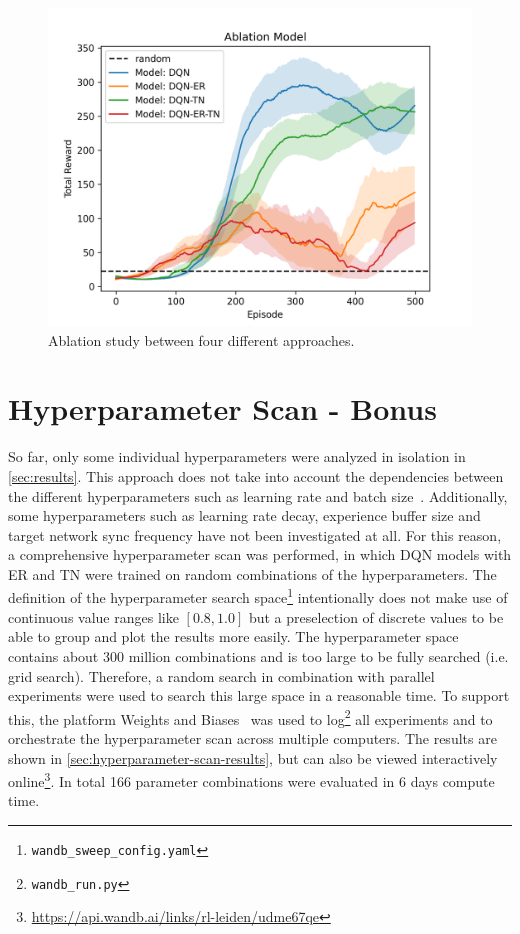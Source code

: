 \documentclass{article}
\begin{document}
\begin{figure}[ht!]
   \centering
   \includegraphics[width=0.9\columnwidth]{assets/Ablation/ablation_study.png}
   \caption{Ablation study between four different approaches. 
   }
   \label{fig:ablation_study}
\end{figure}


\section{Hyperparameter Scan - Bonus}
\label{sec:bonus}
So far, only some individual hyperparameters were analyzed in isolation in \autoref{sec:results}.
This approach does not take into account the dependencies between the different hyperparameters 
such as learning rate and batch size~\cite{DBLP:conf/iclr/SmithKYL18}.
Additionally, some hyperparameters such as learning rate decay, experience buffer size and target network sync frequency have not been investigated at all.
For this reason, a comprehensive hyperparameter scan was performed, in which DQN models with ER and TN were trained on random combinations of the hyperparameters. 
The definition of the hyperparameter search space\footnote{\texttt{wandb\_sweep\_config.yaml}} 
intentionally does not make use of continuous value ranges like $[0.8, 1.0]$ but a preselection of discrete values to be able to group and plot the results more easily.
The hyperparameter space contains about 300 million combinations and is too large to be fully searched (i.e. grid search). 
Therefore, a random search in combination with parallel experiments were used to search this large space in a reasonable time.
To support this, the platform Weights and Biases~\cite{wandb} was used to log\footnote{\texttt{wandb\_run.py}} all experiments and to orchestrate the hyperparameter scan across multiple computers.
The results are shown in \autoref{sec:hyperparameter-scan-results},
but can also be viewed interactively online\footnote{\url{https://api.wandb.ai/links/rl-leiden/udme67qe}}. 
In total 166 parameter combinations were evaluated in 6 days compute time.
\end{document}
